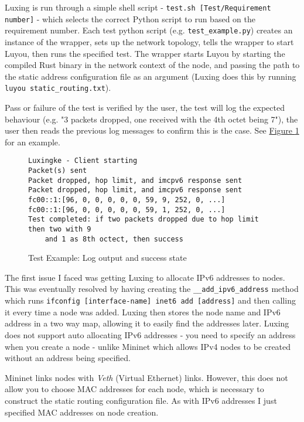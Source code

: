 \documentclass[12pt,a4paper,twoside,openany]{report}
\begin{document}
\bigskip

Luxing is run through a simple shell script - \verb!test.sh [Test/Requirement number]! - which selects the correct Python script to run based on the requirement number. Each test python script (e.g. \verb!test_example.py!) creates an instance of the wrapper, sets up the network topology, tells the wrapper to start Luyou, then runs the specified test. The wrapper starts Luyou by starting the compiled Rust binary in the network context of the node, and passing the path to the static address configuration file as an argument (Luxing does this by running \verb!luyou static_routing.txt!).

\bigskip

Pass or failure of the test is verified by the user, the test will log the expected behaviour (e.g. "3 packets dropped, one received with the 4th octet being 7"), the user then reads the previous log messages to confirm this is the case. See \hyperref[fig::test_success]{Figure }\ref{fig::test_success} for an example.

\begin{figure}
\begin{verbatim}
Luxingke - Client starting
Packet(s) sent
Packet dropped, hop limit, and imcpv6 response sent
Packet dropped, hop limit, and imcpv6 response sent
fc00::1:[96, 0, 0, 0, 0, 0, 59, 9, 252, 0, ...]
fc00::1:[96, 0, 0, 0, 0, 0, 59, 1, 252, 0, ...]
Test completed: if two packets dropped due to hop limit then two with 9 
    and 1 as 8th octect, then success
\end{verbatim}
\caption{Test Example: Log output and success state}
\label{fig::test_success}
\end{figure}

\bigskip

The first issue I faced was getting Luxing to allocate IPv6 addresses to nodes. This was eventually resolved by having creating the \verb!__add_ipv6_address! method which runs \verb!ifconfig [interface-name] inet6 add [address]! and then calling it every time a node was added. Luxing then stores the node name and IPv6 address in a two way map, allowing it to easily find the addresses later. Luxing does not support auto allocating IPv6 addresses - you need to specify an address when you create a node - unlike Mininet which allows IPv4 nodes to be created without an address being specified.

\bigskip

Mininet links nodes with \textit{Veth} (Virtual Ethernet) links. However, this does not allow you to choose MAC addresses for each node, which is necessary to construct the static routing configuration file. As with IPv6 addresses I just specified MAC addresses on node creation.
\end{document}
